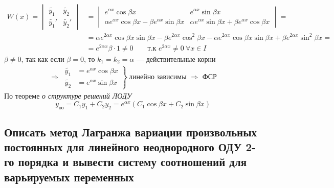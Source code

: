 \begin{align*}
    W(x) = \begin{vmatrix}
        \widetilde{y_1} & \widetilde{y_2} \\
        \widetilde{y_1}' & \widetilde{y_2}'
    \end{vmatrix} &= \begin{vmatrix}
        e^{\alpha x} \cos \beta x & e^{\alpha x} \sin \beta x \\
        \alpha e^{\alpha x} \cos \beta x - \beta e^{\alpha x} \sin \beta x & \alpha e^{\alpha x} \sin \beta x + \beta e^{\alpha x} \cos \beta x
    \end{vmatrix} = \\
    &= \alpha e^{2 \alpha x} \cos \beta x \sin \beta x - \beta e^{2 \alpha x} \cos^2 \beta x - \alpha e^{2 \alpha x} \cos \beta x \sin \beta x + \beta e^{2 \alpha x} \sin^2 \beta x = \\
    &= e^{2 \alpha x} \beta \cdot 1 \ne 0\qquad \text{т.к } e^{2 \alpha x} \ne 0\ \forall x \in I
\end{align*}
$\beta \ne 0$, так как если $\beta = 0$, то $k_1 = k_2 = \alpha$ --- действительные корни\\
\begin{gather*}
    \Rightarrow\ \left. \begin{aligned}
        \widetilde{y_1} &= e^{\alpha x} \cos \beta x \\
        \widetilde{y_2} &= e^{\alpha x} \sin \beta x
    \end{aligned} \right\}\ \text{линейно зависимы } \Rightarrow \text{ ФСР}
\end{gather*}
По теореме \textit{о структуре решений ЛОДУ}
\[
    y_{\text{оо}} = C_1 y_1 + C_2 y  _2 = e^{\alpha x} \left(C_1 \cos \beta x + C_2 \sin \beta x\right)
\]

\subsection{Описать метод Лагранжа вариации произвольных постоянных для линейного неоднородного ОДУ 2-го порядка и вывести систему соотношений для варьируемых переменных}


